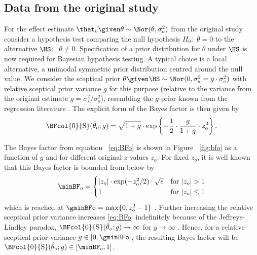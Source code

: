 \subsection{Data from the original study}
For the effect estimate $\that_o \given \theta \sim \Nor(\theta, \sigma^2_o)$
from the original study consider a hypothesis test comparing the null hypothesis
$H_0\colon$ $\theta = 0$ to the alternative $\HS \colon$ $\theta \neq 0$.
Specification of a prior distribution for $\theta$ under $\HS$ is now required
for Bayesian hypothesis testing. A typical choice \citep{Jeffreys1961} is a
local alternative, a unimodal symmetric prior distribution centred around the
null value. We consider the sceptical prior
$\theta \given \HS \sim \Nor(0, \sigma^2_s = g \cdot \sigma^2_o)$ with relative
sceptical prior variance $g$ for this purpose (relative to the variance from the
original estimate $g = \sigma^2_s/\sigma^2_o$), resembling the $g$-prior known
from the regression literature \citep{Zellner1986, Liang2008}. The explicit form
of the Bayes factor is then given by
\begin{align}
  \label{eq:BFo}
  \BFcol{0}{\mathrm{S}}(\hat{\theta}_o; g)
  = \sqrt{1 + g} \cdot
  \exp\left\{-\frac{1}{2} \cdot \frac{g}{1 + g} \cdot z^2_o\right\}.
\end{align}

The Bayes factor from equation ~\eqref{eq:BFo} is shown in Figure ~\ref{fig:bfo}
as a function of $g$ and for different original $z$-values $z_o$. For fixed
$z_o$, it is well known that this Bayes factor is bounded from below by
\begin{align}
  \label{eq:minBFo}
  \minBF_{o} =
  \begin{cases}
    |z_o| \cdot  \exp(-z_o^2/2) \cdot \sqrt{e} & \text{for} ~ |z_o| > 1 \\
    1 & \text{for} ~ |z_o| \leq 1
  \end{cases}
\end{align}
which is reached at $\gminBFo = \max\{0, z^2_o - 1\}$ \citep{Edwards1963}.
Further increasing the relative sceptical prior variance increases
\eqref{eq:BFo} indefinitely because of the Jeffreys-Lindley paradox, \ie
$\BFcol{0}{\mathrm{S}}(\hat{\theta}_o; g) \to \infty$ for $g \to \infty$
\citep[][Section 6.1.4]{Bernardo2000}. Hence, for a relative sceptical prior
variance $g \in [0, \gminBFo]$, the resulting Bayes factor will be
$\BFcol{0}{\mathrm{S}}(\hat{\theta}_o; g) \in [\minBF_o, 1]$.

